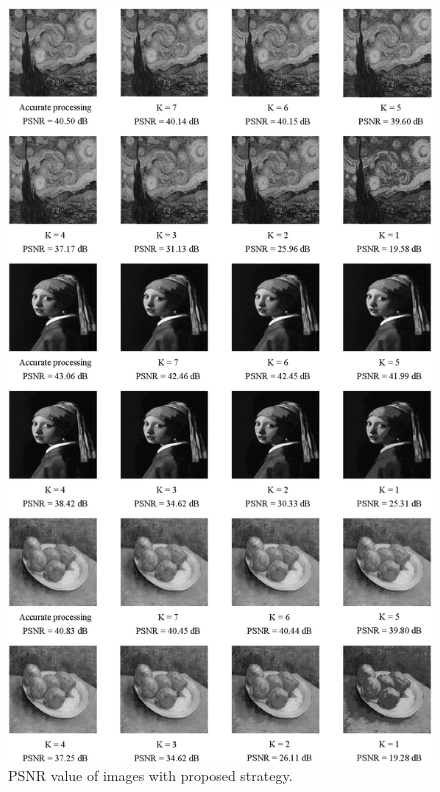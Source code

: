 \documentclass[lettersize,journal]{IEEEtran}
\begin{document}
\begin{figure}[htb]
	\centering
	\includegraphics[width=\linewidth]{Fig/PSNR value of images with proposed strategy.png}
	{\color{red}\caption{PSNR value of images with proposed strategy.}}
	\label{fig10}
\end{figure}
\end{document}
